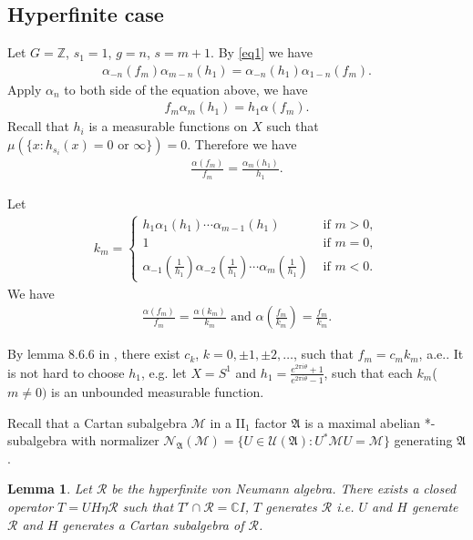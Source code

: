 \documentclass[a4paper,10pt]{amsart}
\newtheorem{lemma}{Lemma}[section]
\newcommand{\AAA}{\mathfrak A}
\newcommand{\MMM}{\mathcal M}
\newcommand{\C}{\mathbb C} %
\newcommand{\Z}{\mathbb Z} %
\begin{document}
\subsection{Hyperfinite case}

Let $G = \Z$, $s_1 = 1$, $g = n$, $s = m+1$. By \cref{eq1} we have
\begin{align*}
    \alpha_{-n}(f_{m})\alpha_{m-n}(h_{1}) =
\alpha_{-n}(h_{1})\alpha_{1-n}(f_{m}).
\end{align*}
Apply $\alpha_{n}$ to both side of the equation above, we have
\begin{align*}
f_{m}\alpha_{m}(h_{1}) =
h_{1}\alpha(f_{m}).
\end{align*}
Recall that $h_{i}$ is a measurable functions on $X$ such that 
$\mu(\{x : h_{s_i}(x) = 0 \mbox{ or } \infty \}) = 0$.
Therefore we have
\begin{align*}
\frac{\alpha(f_{m})}{f_{m}} = \frac{\alpha_{m}(h_{1})}{h_{1}}.
\end{align*}

Let
\begin{align*}
   k_{m} =  \begin{cases}
       h_{1}\alpha_{1}(h_{1})\cdots\alpha_{m-1}(h_{1}) &\mbox{ if } m > 0, \\
       1 &\mbox{ if } m = 0, \\
       \alpha_{-1}(\frac{1}{h_1})\alpha_{-2}(\frac{1}{h_1})
       \cdots\alpha_{m}(\frac{1}{h_1}) &\mbox{ if } m < 0.
   \end{cases} 
\end{align*}
We have
\begin{align*}
    \frac{\alpha(f_{m})}{f_{m}} = \frac{\alpha(k_{m})}{k_{m}} \mbox{ and } 
    \alpha(\frac{f_{m}}{k_{m}}) = \frac{f_{m}}{k_{m}}.
\end{align*}

By lemma 8.6.6 in \cite{KR}, there exist $c_{k}$, $k = 0, \pm 1, \pm 2, \ldots$, such
that $f_{m} = c_{m}k_{m}$, a.e..
It is not hard to choose $h_1$, e.g. let $X = S^{1}$ and 
$h_1 = \frac{e^{2\pi i \theta} + 1}
{e^{2\pi i \theta} -1}$, 
such that each $k_m$($m \neq 0)$ is an unbounded 
measurable function.

Recall that a Cartan subalgebra $\MMM$ in a II$_1$ factor $\AAA$ is a maximal
abelian *-subalgebra with normalizer $\mathcal{N}_{\AAA}(\MMM) =
\{ U \in \mathcal{U}(\AAA) : U^{*}\MMM  U = \MMM\}$ generating $\AAA$.

\begin{lemma} \label{hy_lam1}
    Let $\mathcal{R}$ be the hyperfinite von Neumann algebra. There exists 
    a closed operator $T = UH \eta \mathcal{R}$ such that 
    $T' \cap \mathcal{R} = \C I$, $T$ generates $\mathcal{R}$ i.e.
    $U$ and $H$ generate $\mathcal{R}$ and $H$ generates a Cartan subalgebra of 
    $\mathcal{R}$.
\end{lemma}
\end{document}
